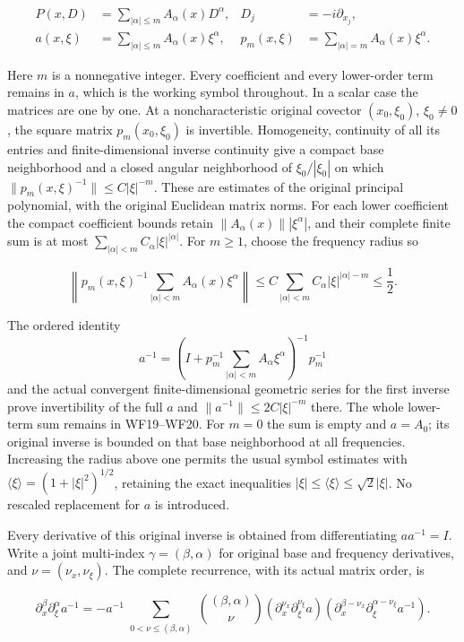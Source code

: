 \documentclass[
  11pt,
]{article}
\begin{document}
\[
\begin{aligned}
P(x,D)&=\sum_{|\alpha|\leq m}A_\alpha(x)D^\alpha,
&D_j&=-i\partial_{x_j},\\
a(x,\xi)&=\sum_{|\alpha|\leq m}A_\alpha(x)\xi^\alpha,
&p_m(x,\xi)&=\sum_{|\alpha|=m}A_\alpha(x)\xi^\alpha .
\end{aligned}
\tag{WF18}
\]

Here \(m\) is a nonnegative integer. Every coefficient and every
lower-order term remains in \(a\), which is the working symbol
throughout. In a scalar case the matrices are one by one. At a
noncharacteristic original covector \((x_0,\xi_0)\), \(\xi_0\ne0\), the
square matrix \(p_m(x_0,\xi_0)\) is invertible. Homogeneity, continuity
of all its entries and finite-dimensional inverse continuity give a
compact base neighborhood and a closed angular neighborhood of
\(\xi_0/|\xi_0|\) on which \(\|p_m(x,\xi)^{-1}\|\leq C|\xi|^{-m}\).
These are estimates of the original principal polynomial, with the
original Euclidean matrix norms. For each lower coefficient the compact
coefficient bounds retain \(\|A_\alpha(x)\||\xi^\alpha|\), and their
complete finite sum is at most
\(\sum_{|\alpha|<m}C_\alpha|\xi|^{|\alpha|}\). For \(m\geq1\), choose
the frequency radius so

\[
\left\|p_m(x,\xi)^{-1}
       \sum_{|\alpha|<m}A_\alpha(x)\xi^\alpha\right\|
\leq C\sum_{|\alpha|<m}C_\alpha|\xi|^{|\alpha|-m}
\leq\frac12 .
\tag{WF19}
\]

The ordered identity \[
a^{-1}
=\left(I+p_m^{-1}\sum_{|\alpha|<m}A_\alpha\xi^\alpha\right)^{-1}
        p_m^{-1}
\tag{WF20}
\] and the actual convergent finite-dimensional geometric series for the
first inverse prove invertibility of the full \(a\) and
\(\|a^{-1}\|\leq2C|\xi|^{-m}\) there. The whole lower-term sum remains
in WF19--WF20. For \(m=0\) the sum is empty and \(a=A_0\); its original
inverse is bounded on that base neighborhood at all frequencies.
Increasing the radius above one permits the usual symbol estimates with
\(\langle\xi\rangle=(1+|\xi|^2)^{1/2}\), retaining the exact
inequalities \(|\xi|\leq\langle\xi\rangle\leq\sqrt2|\xi|\). No rescaled
replacement for \(a\) is introduced.

Every derivative of this original inverse is obtained from
differentiating \(aa^{-1}=I\). Write a joint multi-index
\(\gamma=(\beta,\alpha)\) for original base and frequency derivatives,
and \(\nu=(\nu_x,\nu_\xi)\). The complete recurrence, with its actual
matrix order, is

\[
\partial_x^\beta\partial_\xi^\alpha a^{-1}
=-a^{-1}
 \sum_{\substack{0<\nu\leq(\beta,\alpha)}}
  \binom{(\beta,\alpha)}{\nu}
  (\partial_x^{\nu_x}\partial_\xi^{\nu_\xi}a)
  (\partial_x^{\beta-\nu_x}
        \partial_\xi^{\alpha-\nu_\xi}a^{-1}) .
\tag{WF21}
\]
\end{document}
